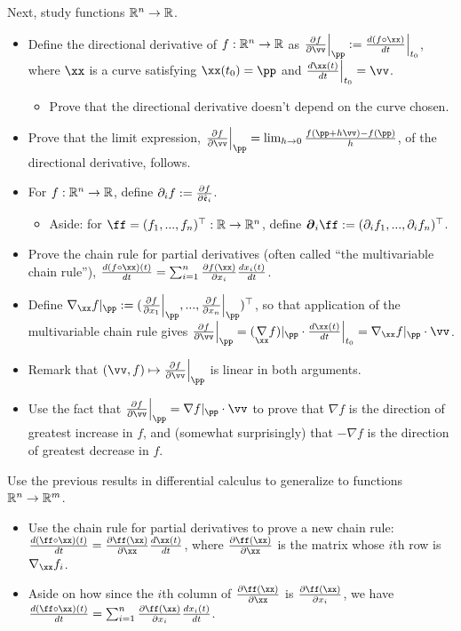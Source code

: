 Next, study functions $\mathbb{R}^n \rightarrow \mathbb{R}$.
    
\begin{itemize}
    \item Define the directional derivative of $f:\mathbb{R}^n \rightarrow \mathbb{R}$ as $\frac{\pd f}{\pd \vv} \Big|_\pp := \frac{d (f \circ \xx)}{dt}\Big|_{t_0}$, where $\xx$ is a curve satisfying $\xx(t_0) = \pp$ and $\frac{d\xx(t)}{dt}\Big|_{t_0} = \vv$.
    \begin{itemize}
        \item Prove that the directional derivative doesn't depend on the curve chosen.
    \end{itemize}
    \item Prove that the limit expression, $\frac{\pd f}{\pd \vv}\Big|_\pp = \lim_{h \rightarrow 0} \frac{f(\pp + h\vv) - f(\pp)}{h}$, of the directional derivative, follows.
    \item For $f:\mathbb{R}^n \rightarrow \mathbb{R}$, define $\partial_i f := \frac{\partial f}{\partial \hat{\mathfrak{e}}_i}$.
    \begin{itemize}
        \item Aside: for $\ff = (f_1, ..., f_n)^\top:\R \rightarrow \R^n$, define $\boldsymbol{\pd}_i \ff := (\pd_i f_1, ..., \pd_i f_n)^\top$.
    \end{itemize}
    \item Prove the chain rule for partial derivatives (often called ``the multivariable chain rule''), $\frac{d (f \circ \xx)(t)}{dt} =\sum_{i = 1}^n \frac{\pd f(\xx)}{\pd x_i} \frac{dx_i(t)}{dt}$.
    \item Define $\nabla_\xx f|_\pp := (\frac{\pd f}{\pd x_1}\Big|_\pp, ..., \frac{\pd f}{\pd x_n}\Big|_\pp)^\top$, so that application of the multivariable chain rule gives $\frac{\pd f}{\pd \vv} \Big|_\pp = (\underset{\xx}{\nabla} f)|_\pp \cdot \frac{d\xx(t)}{dt}\Big|_{t_0}= \nabla_\xx f|_\pp \cdot \vv$.
    \item Remark that $(\vv, f) \mapsto \frac{\pd f}{\pd \vv} \Big|_\pp$ is linear in both arguments.
    \item Use the fact that $\frac{\pd f}{\pd \vv}\Big|_\pp = \nabla f|_\pp \cdot \vv$ to prove that $\nabla f$ is the direction of greatest increase in $f$, and (somewhat surprisingly) that $-\nabla f$ is the direction of greatest decrease in $f$.
\end{itemize}

Use the previous results in differential calculus to generalize to functions $\mathbb{R}^n \rightarrow \mathbb{R}^m$.

\begin{itemize}
    \item Use the chain rule for partial derivatives to prove a new chain rule: $\frac{d (\ff \circ \xx)(t)}{dt} = \frac{\pd \ff(\xx)}{\pd \xx} \frac{d\xx(t)}{dt}$, where $\frac{\pd \ff(\xx)}{\pd \xx}$ is the matrix whose $i$th row is $\nabla_\xx f_i$.
    \item Aside on how since the $i$th column of $\frac{\pd \ff(\xx)}{\pd \xx}$ is $\frac{\pd \ff(\xx)}{\pd x_i}$, we have $\frac{d (\ff \circ \xx)(t)}{dt} = \sum_{i = 1}^{n} \frac{\pd \ff(\xx)}{\pd x_i} \frac{d x_i(t)}{dt}$.
\end{itemize}

